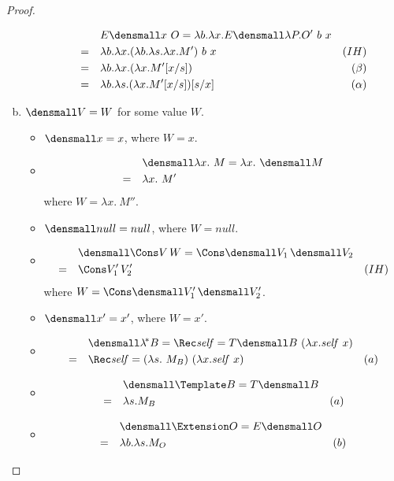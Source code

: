 \begin{proof}
\begin{enumerate}[(a)]
\begin{itemize}
        \begin{align*}
            & \quad E\den{x ~O} =  \lambda b. \lambda x. E\den{\lambda P. O'} ~ b ~ x\\
            =& \quad \lambda b. \lambda x. (\lambda b. \lambda s. \lambda x. M') ~ b ~ x & (IH) \\
            =& \quad \lambda b. \lambda x. (\lambda x. M'\subst{s}{x}) & (\beta) \\
            =& \quad \lambda b. \lambda s. (\lambda x. M'\subst{s}{x})\subst{x}{s} & (\alpha)
        \end{align*}
    \end{itemize}
\item $\den{V} = W$ for some value $W$.
    \begin{itemize}
        \item $\den{x} = x$, where $W=x$.
        \item \begin{align*}
            & \quad \den{\lambda x. ~M} = \lambda x. ~\den{M} \\
            =& \quad \lambda x. ~M'
        \end{align*}
        where $W = \lambda x. ~M''$.
        \item $\den{null} = null$, where $W=null$.
        \item \begin{align*}
            & \quad \den{\Cons V \, W} = \Cons \den{V_1} \, \den{V_2} \\
            =& \quad \Cons V_1' \, V_2' & (IH)
        \end{align*}
        where $W = \Cons \den{V_1'} \, \den{V_2'}$.
        \item $\den{x'} = x'$, where $W=x'$.
        \item \begin{align*}
            & \quad \den{\lamstar B} = \Rec \mathit{self} = T\den{B} ~ (\lambda x. \mathit{self} ~ x) \\
            =& \quad \Rec \mathit{self} = (\lambda s. ~M_B) ~ (\lambda x. \mathit{self} ~ x) & (a)
        \end{align*}
        \item \begin{align*}
            & \quad \den{\Template B} = T\den{B} \\
            =& \quad \lambda s. M_B& (a)
        \end{align*}
        \item \begin{align*}
            & \quad \den{\Extension O} = E\den{O} \\
            =& \quad \lambda b. \lambda s. M_O& (b)
        \end{align*}
    \end{itemize}
\end{enumerate}

\end{proof}


